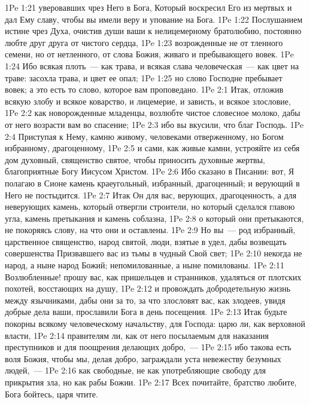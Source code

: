 \vs 1Pe 1:21 уверовавших чрез Него в Бога, Который воскресил Его из мертвых и дал Ему славу, чтобы вы имели веру и упование на Бога.
\rsbpar\vs 1Pe 1:22 Послушанием истине чрез Духа, очистив души ваши к нелицемерному братолюбию, постоянно любте друг друга от чистого сердца,
\vs 1Pe 1:23  возрожденные не от тленного семени, но от нетленного, от слова Божия, живаго и пребывающего вовек.
\vs 1Pe 1:24 Ибо всякая плоть~--- как трава, и всякая слава человеческая~--- как цвет на траве: засохла трава, и цвет ее опал;
\vs 1Pe 1:25 но слово Господне пребывает вовек; а это есть то слово, которое вам проповедано.
\vs 1Pe 2:1 Итак, отложив всякую злобу и всякое коварство, и лицемерие, и зависть, и всякое злословие,
\vs 1Pe 2:2 как новорожденные младенцы, возлюбте чистое словесное молоко, дабы от него возрасти вам во спасение;
\vs 1Pe 2:3 ибо вы вкусили, что благ Господь.
\vs 1Pe 2:4 Приступая к Нему, камню живому, человеками отверженному, но Богом избранному, драгоценному,
\vs 1Pe 2:5 и сами, как живые камни, устрояйте из себя дом духовный, священство святое, чтобы приносить духовные жертвы, благоприятные Богу Иисусом Христом.
\vs 1Pe 2:6 Ибо сказано в Писании: вот, Я полагаю в Сионе камень краеугольный, избранный, драгоценный; и верующий в Него не постыдится.
\vs 1Pe 2:7 Итак Он для вас, верующих, драгоценность, а для неверующих камень, который отвергли строители, но который сделался главою угла, камень претыкания и камень соблазна,
\vs 1Pe 2:8 о который они претыкаются, не покоряясь слову, на что они и оставлены.
\vs 1Pe 2:9 Но вы~--- род избранный, царственное священство, народ святой, люди, взятые в удел, дабы возвещать совершенства Призвавшего вас из тьмы в чудный Свой свет;
\vs 1Pe 2:10 некогда не народ, а ныне народ Божий;  непомилованные, а ныне помилованы.
\vs 1Pe 2:11 Возлюбленные! прошу вас, как пришельцев и странников, удаляться от плотских похотей, восстающих на душу,
\vs 1Pe 2:12 и провождать добродетельную жизнь между язычниками, дабы они за то, за что злословят вас, как злодеев, увидя добрые дела ваши, прославили Бога в день посещения.
\vs 1Pe 2:13 Итак будьте покорны всякому человеческому начальству, для Господа: царю ли, как верховной власти,
\vs 1Pe 2:14 правителям ли, как от него посылаемым для наказания преступников и для поощрения делающих добро,~---
\vs 1Pe 2:15 ибо такова есть воля Божия, чтобы мы, делая добро, заграждали уста невежеству безумных людей,~---
\vs 1Pe 2:16 как свободные, не как употребляющие свободу для прикрытия зла, но как рабы Божии.
\vs 1Pe 2:17 Всех почитайте, братство любите, Бога бойтесь, царя чтите.
